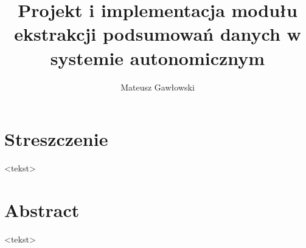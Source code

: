 \documentclass[inzynier,druk]{dyplom}
\author{Mateusz Gawłowski}
\title{Projekt i implementacja modułu ekstrakcji podsumowań danych w systemie autonomicznym}
\makeatletter
\renewcommand*{\listof}[2]{%
  \@ifundefined{ext@#1}{\float@error{#1}}{%
    \expandafter\let\csname l@#1\endcsname \l@figure  %
    \float@listhead{#2}%
    \begingroup
      \setlength\parskip{0pt plus 1pt}%
      \@starttoc{\@nameuse{ext@#1}}%
    \endgroup}}
\makeatother
\begin{document}
\maketitle

\tableofcontents




\chapter*{Streszczenie} %

<tekst>


\begingroup
\renewcommand{\cleardoublepage}{}
\renewcommand{\clearpage}{}
\chapter*{Abstract} %

<tekst>


\endgroup
{}
















\end{document}
